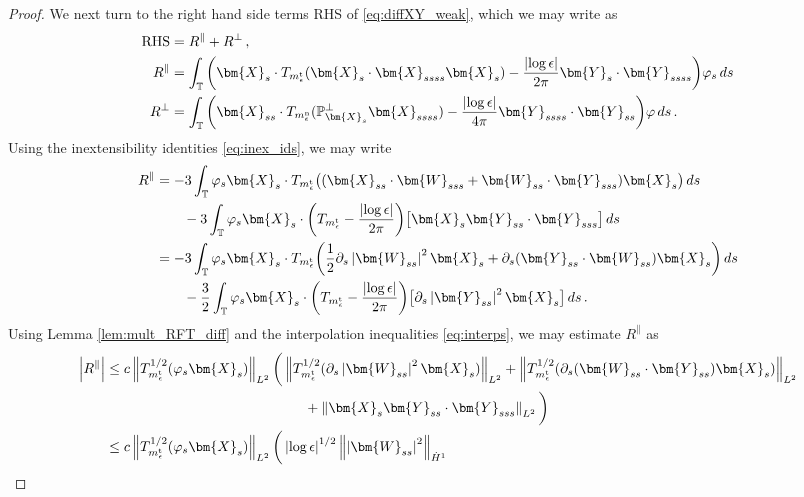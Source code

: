 \documentclass[11pt,reqno]{amsart}
\newcommand{\T}{\mathbb{T}}
\renewcommand{\P}{\mathbb{P}}
\newcommand{\X}{\bm{X}}
\newcommand{\Y}{\bm{Y}}
\newcommand{\p}{\partial}
\newcommand{\abs}[1]{\left\lvert #1 \right\rvert}
\newcommand{\norm}[1]{\left\lVert #1 \right\rVert}
\numberwithin{equation}{section}
\theoremstyle{definition}
\begin{document}
\begin{proof}
We next turn to the right hand side terms RHS of \eqref{eq:diffXY_weak}, which we may write as 
\begin{equation}
\begin{aligned}
  {\rm RHS} &= R^\parallel + R^\perp \,,\\
  R^\parallel &= \int_\T \bigg(\X_s\cdot T_{m_\epsilon^{\rm t}}(\X_s\cdot\X_{ssss}\X_s) - \frac{\abs{\log\epsilon}}{2\pi}\Y_s\cdot\Y_{ssss}\bigg)\varphi_s\,ds \\
  R^\perp &= \int_\T \bigg(\X_{ss}\cdot T_{m_\epsilon^{\rm n}}(\P_{\X_s}^\perp\X_{ssss}) - \frac{\abs{\log\epsilon}}{4\pi}\Y_{ssss}\cdot\Y_{ss} \bigg)\varphi\,ds \,.
\end{aligned}
\end{equation}
%
%
Using the inextensibility identities \eqref{eq:inex_ids}, we may write
\begin{equation}
\begin{aligned}
  R^\parallel &= -3\int_\T \varphi_s\X_s\cdot T_{m_\epsilon^{\rm t}}\big( (\X_{ss}\cdot\bm{W}_{sss}+\bm{W}_{ss}\cdot\Y_{sss})\X_s\big) \,ds\\
  &\qquad -3\int_\T \varphi_s\X_s\cdot \bigg(T_{m_\epsilon^{\rm t}}- \frac{\abs{\log\epsilon}}{2\pi}\bigg)\big[\X_s \Y_{ss}\cdot\Y_{sss}\big]\,ds\\
  &= -3\int_\T \varphi_s\X_s\cdot T_{m_\epsilon^{\rm t}}\bigg( \frac{1}{2}\p_s\abs{\bm{W}_{ss}}^2\X_s+\p_s(\Y_{ss}\cdot\bm{W}_{ss})\X_s\bigg) \,ds\\
  &\qquad -\frac{3}{2}\int_\T \varphi_s\X_s\cdot \bigg(T_{m_\epsilon^{\rm t}}- \frac{\abs{\log\epsilon}}{2\pi}\bigg)\big[\p_s\abs{\Y_{ss}}^2\X_s\big]\,ds\,.
\end{aligned}
\end{equation}
Using Lemma \ref{lem:mult_RFT_diff} and the interpolation inequalities \eqref{eq:interps}, we may estimate $R^\parallel$ as 
\begin{equation}\label{eq:Rpar_bd}
\begin{aligned}
  \abs{R^\parallel} &\le c \norm{T_{m_\epsilon^{\rm t}}^{1/2}(\varphi_s\X_s)}_{L^2}
  \bigg(\norm{T_{m_\epsilon^{\rm t}}^{1/2}(\p_s\abs{\bm{W}_{ss}}^2\X_s)}_{L^2}+\norm{T_{m_\epsilon^{\rm t}}^{1/2}(\p_s(\bm{W}_{ss}\cdot\Y_{ss})\X_s)}_{L^2}\\
  &\hspace{5cm} + \norm{\X_s \Y_{ss}\cdot\Y_{sss}}_{L^2}\bigg)\\
  &\le c\norm{T_{m_\epsilon^{\rm t}}^{1/2}(\varphi_s\X_s)}_{L^2}
  \bigg(\abs{\log\epsilon}^{1/2}\norm{\abs{\bm{W}_{ss}}^2}_{\dot H^1}

\end{aligned}
\end{equation}
\end{proof}
\end{document}
